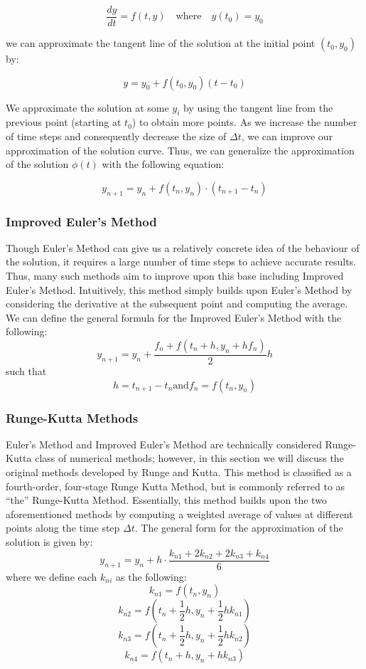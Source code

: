 \documentclass{article} %
\begin{document}
\begin{multicols}{2}
\[
    \frac{dy}{dt} = f(t, y) \quad \text{where} \quad y(t_{0}) = y_{0}
\]

we can approximate the tangent line of the solution at the initial point $(t_{0}, y_{0})$ by:

\[
    y = y_{0} + f(t_{0}, y_{0})(t - t_{0})
\]

We approximate the solution at some $y_{i}$ by using the tangent line from the previous point (starting at $t_{0}$) to obtain more points.
As we increase the number of time steps and consequently decrease the size of $\Delta t$, we can improve our approximation of the solution curve.
Thus, we can generalize the approximation of the solution $\phi(t)$ with the following equation:

\[
    y_{n+1} = y_{n} + f(t_{n}, y_{n}) \cdot (t_{n+1} - t_{n})
\]

\subsubsection{Improved Euler's Method}
\label{subsubsec:improved_euler_method} %

Though Euler's Method can give us a relatively concrete idea of the behaviour of the solution, it requires a large number of time steps to achieve accurate results.
Thus, many such methods aim to improve upon this base including Improved Euler's Method.
Intuitively, this method simply builds upon Euler's Method by considering the derivative at the subsequent point and computing the average.
We can define the general formula for the Improved Euler's Method with the following:
\[
    y_{n+1} = y_{n} + \frac{f_{n} + f(t_{n} + h, y_{n} + hf_{n})}{2}h
\]
such that 
\[
    h = t_{n + 1} - t_{n} \text{and} f_{n} = f(t_{n}, y_{n})
\]

\subsubsection{Runge-Kutta Methods}
\label{subsubsec:runge_kutta}

Euler's Method and Improved Euler's Method are technically considered Runge-Kutta class of numerical methods; however, in this section we will discuss the original methods developed by Runge and Kutta.
This method is classified as a fourth-order, four-stage Runge Kutta Method, but is commonly referred to as ``the'' Runge-Kutta Method.
Essentially, this method builds upon the two aforementioned methods by computing a weighted average of values at different points along the time step $\Delta t$.
The general form for the approximation of the solution is given by:
\[
    y_{n+1} = y_{n} + h \cdot \frac{k_{n1} + 2k_{n2} + 2k_{n3} + k_{n4}}{6}
\]
where we define each $k_{ni}$ as the following:
\[
    k_{n1} = f(t_{n}, y_{n})
\]
\[
    k_{n2} = f\left(t_{n} + \frac{1}{2}h, y_{n} + \frac{1}{2}hk_{n1}\right)
\]
\[
    k_{n3} = f\left(t_{n} + \frac{1}{2}h, y_{n} + \frac{1}{2}hk_{n2}\right)
\]
\[
    k_{n4} = f(t_{n} + h, y_{n} + hk_{n3})
\]


\end{multicols}
\end{document}

